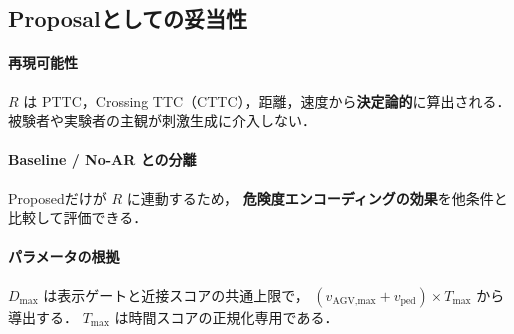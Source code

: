 \subsection{Proposalとしての妥当性}

\paragraph{再現可能性}
$R$ は PTTC，Crossing TTC（CTTC），距離，速度から\textbf{決定論的}に算出される．
被験者や実験者の主観が刺激生成に介入しない．

\paragraph{Baseline / No-AR との分離}
Proposedだけが $R$ に連動するため，
\textbf{危険度エンコーディングの効果}を他条件と比較して評価できる．

\paragraph{パラメータの根拠}
$D_\text{max}$ は表示ゲートと近接スコアの共通上限で，
$(v_\text{AGV,max}+v_\text{ped})\times T_\text{max}$ から導出する．
$T_\text{max}$ は時間スコアの正規化専用である．
